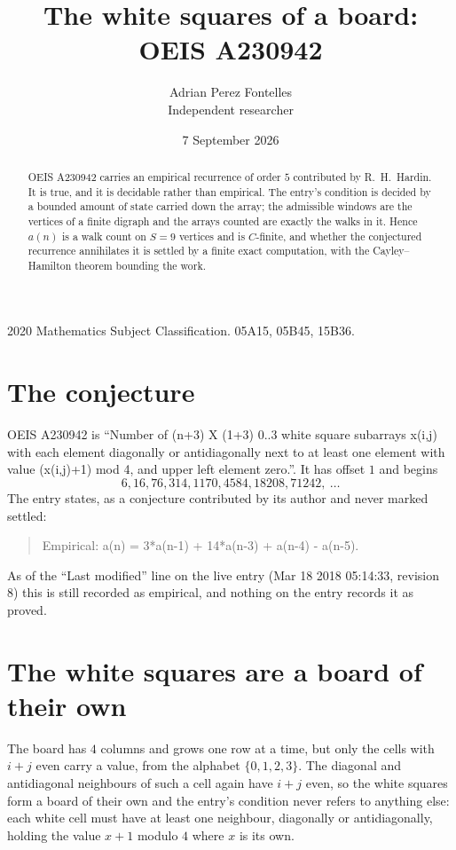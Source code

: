 \documentclass[11pt,a4paper]{article}
\title{The white squares of a board: OEIS A230942}
\author{Adrian Perez Fontelles\\ \small Independent researcher}
\date{7 September 2026}
\theoremstyle{plain}
\theoremstyle{definition}
\begin{document}
\maketitle

\begin{abstract}
OEIS A230942 carries an empirical recurrence of order $5$ contributed by R.~H.~Hardin. It is
true, and it is decidable rather than empirical. The entry's condition is decided by a bounded amount of state carried down the array; the
admissible windows are the vertices of a finite digraph and the arrays counted are exactly the
walks in it. Hence $a(n)$ is a walk count on $S=9$ vertices and is $C$-finite, and whether the
conjectured recurrence annihilates it is settled by a finite exact computation, with the
Cayley--Hamilton theorem bounding the work.
\end{abstract}

\noindent\small 2020 Mathematics Subject Classification. 05A15, 05B45, 15B36.\normalsize

\section{The conjecture}

OEIS A230942 is ``Number of (n+3) X (1+3) 0..3 white square subarrays x(i,j) with each element diagonally or antidiagonally next to at least one element with value (x(i,j)+1) mod 4, and upper left element zero.''. It has offset $1$ and begins
\[
6, 16, 76, 314, 1170, 4584, 18208, 71242,\ \dots
\]
The entry states, as a conjecture contributed by its author and never marked settled:
\begin{quote}
Empirical: a(n) = 3*a(n-1) + 14*a(n-3) + a(n-4) - a(n-5).
\end{quote}
As of the ``Last modified'' line on the live entry (Mar 18 2018 05:14:33, revision 8) this is still
recorded as empirical, and nothing on the entry records it as proved.

\section{The white squares are a board of their own}

The board has $4$ columns and grows one row at a time, but only the cells with $i+j$ even carry a value, from the alphabet $\{0,1,2,3\}$. The diagonal and antidiagonal neighbours of such a cell again have $i+j$ even, so the white squares form a board of their own and the entry's condition never refers to anything else: each white cell must have at least one neighbour, diagonally or antidiagonally, holding the value $x+1$ modulo $4$ where $x$ is its own.
\end{document}
